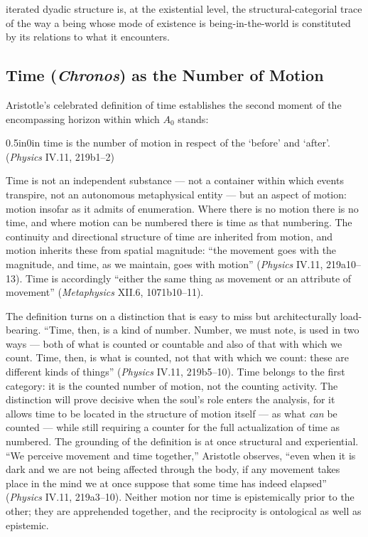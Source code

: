 \documentclass{article}
\begin{document}
iterated dyadic structure is, at the existential level, the structural-categorial trace of the way a being whose mode of existence is being-in-the-world is constituted by its relations to what it encounters.

\subsection{Time (\textit{Chronos}) as the Number of Motion}

Aristotle's celebrated definition of time establishes the second moment of the encompassing horizon within which $A_0$ stands:
\begin{adjustwidth}{0.5in}{0in}
time is the number of motion in respect of the `before' and `after'. (\textit{Physics} IV.11, 219b1--2)
\end{adjustwidth}
Time is not an independent substance --- not a container within which events transpire, not an autonomous metaphysical entity --- but an aspect of motion: motion insofar as it admits of enumeration. Where there is no motion there is no time, and where motion can be numbered there is time as that numbering. The continuity and directional structure of time are inherited from motion, and motion inherits these from spatial magnitude: ``the movement goes with the magnitude, and time, as we maintain, goes with motion'' (\textit{Physics} IV.11, 219a10--13). Time is accordingly ``either the same thing as movement or an attribute of movement'' (\textit{Metaphysics} XII.6, 1071b10--11).

The definition turns on a distinction that is easy to miss but architecturally load-bearing. ``Time, then, is a kind of number. Number, we must note, is used in two ways --- both of what is counted or countable and also of that with which we count. Time, then, is what is counted, not that with which we count: these are different kinds of things'' (\textit{Physics} IV.11, 219b5--10). Time belongs to the first category: it is the counted number of motion, not the counting activity. The distinction will prove decisive when the soul's role enters the analysis, for it allows time to be located in the structure of motion itself --- as what \textit{can} be counted --- while still requiring a counter for the full actualization of time as numbered. The grounding of the definition is at once structural and experiential. ``We perceive movement and time together,'' Aristotle observes, ``even when it is dark and we are not being affected through the body, if any movement takes place in the mind we at once suppose that some time has indeed elapsed'' (\textit{Physics} IV.11, 219a3--10). Neither motion nor time is epistemically prior to the other; they are apprehended together, and the reciprocity is ontological as well as epistemic.
\end{document}
